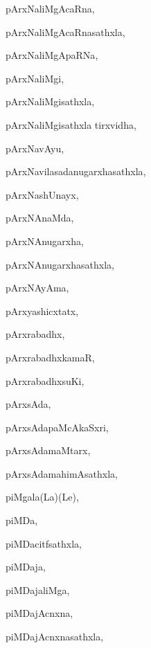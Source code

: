 \begin{multicols}{3}
{\noindent
{pArxNaliMgAcaRna}, \pageref{pArxNaliMgAcaRna}

\noindent
{pArxNaliMgAcaRnasathxla}, \pageref{pArxNaliMgAcaRnasathxla}

\noindent
{pArxNaliMgApaRNa}, \pageref{pArxNaliMgApaRNa}

\noindent
{pArxNaliMgi}, \pageref{pArxNaliMgi}

\noindent
{pArxNaliMgisathxla}, \pageref{pArxNaliMgisathxla}

\noindent
{pArxNaliMgisathxla tirxvidha}, \pageref{pArxNaliMgisathxla tirxvidha}

\noindent
{pArxNavAyu}, \pageref{pArxNavAyu}

\noindent
{pArxNavilasadanugarxhasathxla}, \pageref{pArxNavilasadanugarxhasathxla}

\noindent
{pArxNashUnayx}, \pageref{pArxNashUnayx}

\noindent
{pArxNAnaMda}, \pageref{pArxNAnaMda}

\noindent
{pArxNAnugarxha}, \pageref{pArxNAnugarxha}

\noindent
{pArxNAnugarxhasathxla}, \pageref{pArxNAnugarxhasathxla}

\noindent
{pArxNAyAma}, \pageref{pArxNAyAma}

\noindent
{pArxyashicxtatx}, \pageref{pArxyashicxtatx}

\noindent
{pArxrabadhx}, \pageref{pArxrabadhx}

\noindent
{pArxrabadhxkamaR}, \pageref{pArxrabadhxkamaR}

\noindent
{pArxrabadhxsuKi}, \pageref{pArxrabadhxsuKi}

\noindent
{pArxsAda}, \pageref{pArxsAda}

\noindent
{pArxsAdapaMcAkaSxri}, \pageref{pArxsAdapaMcAkaSxri}

\noindent
{pArxsAdamaMtarx}, \pageref{pArxsAdamaMtarx}

\noindent
{pArxsAdamahimAsathxla}, \pageref{pArxsAdamahimAsathxla}

\noindent
{piMgala(La)(Le)}, \pageref{piMgalaLaLe}

\noindent
{piMDa}, \pageref{piMDa}

\noindent
{piMDacitfsathxla}, \pageref{piMDacitfsathxla}

\noindent
{piMDaja}, \pageref{piMDaja}

\noindent
{piMDajaliMga}, \pageref{piMDajaliMga}

\noindent
{piMDajAcnxna}, \pageref{piMDajAcnxna}

\noindent
{piMDajAcnxnasathxla}, \pageref{piMDajAcnxnasathxla}

}
\end{multicols}
